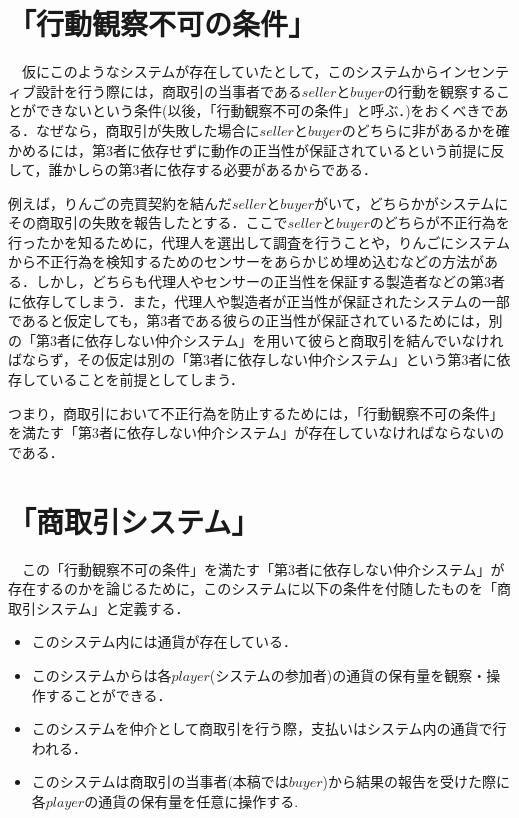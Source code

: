 \documentclass[twocolumn, a4j]{article}
\begin{document}
\section{「行動観察不可の条件」}
  　仮にこのようなシステムが存在していたとして，このシステムからインセンティブ設計を行う際には，商取引の当事者である$seller$と$buyer$の行動を観察することができないという条件(以後，「行動観察不可の条件」と呼ぶ．)をおくべきである．なぜなら，商取引が失敗した場合に$seller$と$buyer$のどちらに非があるかを確かめるには，第3者に依存せずに動作の正当性が保証されているという前提に反して，誰かしらの第3者に依存する必要があるからである．

  例えば，りんごの売買契約を結んだ$seller$と$buyer$がいて，どちらかがシステムにその商取引の失敗を報告したとする．ここで$seller$と$buyer$のどちらが不正行為を行ったかを知るために，代理人を選出して調査を行うことや，りんごにシステムから不正行為を検知するためのセンサーをあらかじめ埋め込むなどの方法がある．しかし，どちらも代理人やセンサーの正当性を保証する製造者などの第3者に依存してしまう．また，代理人や製造者が正当性が保証されたシステムの一部であると仮定しても，第3者である彼らの正当性が保証されているためには，別の「第3者に依存しない仲介システム」を用いて彼らと商取引を結んでいなければならず，その仮定は別の「第3者に依存しない仲介システム」という第3者に依存していることを前提としてしまう．

  つまり，商取引において不正行為を防止するためには，「行動観察不可の条件」を満たす「第3者に依存しない仲介システム」が存在していなければならないのである．

\section{「商取引システム」}
　この「行動観察不可の条件」を満たす「第3者に依存しない仲介システム」が存在するのかを論じるために，このシステムに以下の条件を付随したものを「商取引システム」と定義する．
\begin{itemize}
  \item このシステム内には通貨が存在している．
  \item このシステムからは各$player$(システムの参加者)の通貨の保有量を観察・操作することができる．
  \item このシステムを仲介として商取引を行う際，支払いはシステム内の通貨で行われる．
  \item このシステムは商取引の当事者(本稿では$buyer$)から結果の報告を受けた際に各$player$の通貨の保有量を任意に操作する.
\end{itemize}
\end{document}
